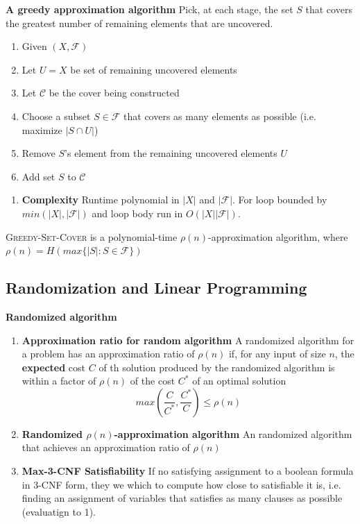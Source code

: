 \documentclass[11pt]{article}
\begin{document}
\begin{defn*}
    \textbf{A greedy approximation algorithm} Pick, at each stage, the set $S$ that covers the greatest number of remaining elements that are uncovered.
    \begin{enumerate}
        \item Given $(X, \mathcal{F})$
        \item Let $U = X$ be set of remaining uncovered elements
        \item Let $\mathcal{C}$ be the cover being constructed
        \item Choose a subset $S \in \mathcal{F}$ that covers as many elements as possible (i.e. maximize $|S\cap U|$)
        \item Remove $S$'s element from the remaining uncovered elements $U$
        \item Add set $S$ to $\mathcal{C}$
    \end{enumerate}  
    \begin{enumerate}
        \item \textbf{Complexity} Runtime polynomial in $|X|$ and $|\mathcal{F}|$. For loop bounded by $min(|X|, |\mathcal{F}|)$ and loop body run in $O(|X||\mathcal{F}|)$. 
    \end{enumerate}
\end{defn*}

\begin{theorem*}
    \textsc{Greedy-Set-Cover} is a polynomial-time $\rho(n)$-approximation algorithm, where $\rho(n) = H(max\{|S|: S\in \mathcal{F} \})$
\end{theorem*}


\subsection*{Randomization and Linear Programming}


\begin{defn*}
    \textbf{Randomized algorithm}
    \begin{enumerate}
        \item \textbf{Approximation ratio for random algorithm} A randomized algorithm for a problem has an approximation ratio of $\rho(n)$ if, for any input of size $n$, the \textbf{expected} cost $C$ of th solution produced by the randomized algorithm is within a factor of $\rho(n)$ of the cost $C^*$ of an optimal solution 
        \[
            max\left(\frac{C}{C^*}, \frac{C^*}{C}\right) \leq \rho(n)
        \]
        \item \textbf{Randomized $\rho(n)$-approximation algorithm} An randomized algorithm that achieves an approximation ratio of $\rho(n)$
        \item \textbf{Max-3-CNF Satisfiability} If no satisfying assignment to a boolean formula in 3-CNF form, they we which to compute how close to satisfiable it is, i.e. finding an assignment of variables that satisfies as many clauses as possible (evaluatign to 1).
    \end{enumerate}
\end{defn*}
\end{document}
